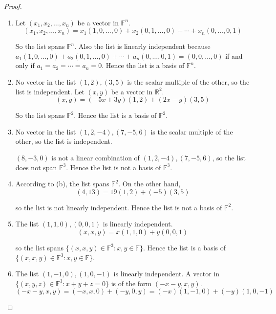 \begin{proof}
    \begin{enumerate}[label={(\alph*)}]
        \item Let $(x_{1}, x_{2}, \ldots, x_{n})$ be a vector in $\mathbb{F}^{n}$.
              \[
                  (x_{1}, x_{2}, \ldots, x_{n}) = x_{1}(1, 0, \ldots, 0) + x_{2}(0, 1, \ldots, 0) + \cdots + x_{n}(0, \ldots, 0, 1)
              \]

              So the list spans $\mathbb{F}^{n}$. Also the list is linearly independent because $a_{1}(1, 0, \ldots, 0) + a_{2}(0, 1, \ldots, 0) + \cdots + a_{n}(0, \ldots, 0, 1) = (0, 0, \ldots, 0)$ if and only if $a_{1} = a_{2} = \cdots = a_{n} = 0$. Hence the list is a basis of $\mathbb{F}^{n}$.

        \item No vector in the list $(1, 2), (3, 5)$ is the scalar multiple of the other, so the list is independent. Let $(x, y)$ be a vector in $\mathbb{R}^{2}$.
              \[
                  (x, y) = (-5x + 3y)(1, 2) + (2x - y)(3, 5)
              \]

              So the list spans $\mathbb{F}^{2}$. Hence the list is a basis of $\mathbb{F}^{2}$.
        \item No vector in the list $(1, 2, -4), (7, -5, 6)$ is the scalar multiple of the other, so the list is independent.

              $(8, -3, 0)$ is not a linear combination of $(1, 2, -4), (7, -5, 6)$, so the list does not span $\mathbb{F}^{3}$. Hence the list is not a basis of $\mathbb{F}^{3}$.
        \item According to (b), the list spans $\mathbb{F}^{2}$. On the other hand,
              \[
                  (4, 13) = 19(1, 2) + (-5)(3, 5)
              \]

              so the list is not linearly independent. Hence the list is not a basis of $\mathbb{F}^{2}$.
        \item The list $(1, 1, 0), (0, 0, 1)$ is linearly independent.
              \[
                  (x, x, y) = x(1, 1, 0) + y(0, 0, 1)
              \]

              so the list spans $\{ (x, x, y)\in\mathbb{F}^{3}: x, y\in\mathbb{F} \}$. Hence the list is a basis of $\{ (x, x, y)\in\mathbb{F}^{3}: x, y\in\mathbb{F} \}$.
        \item The list $(1, -1, 0), (1, 0, -1)$ is linearly independent. A vector in $\{ (x, y, z)\in\mathbb{F}^{3}: x + y + z = 0 \}$ is of the form $(-x-y, x, y)$.
              \[
                  (-x-y, x, y) = (-x, x, 0) + (-y, 0, y) = (-x)(1, -1, 0) + (-y)(1, 0, -1)
              \]


\end{enumerate}
\end{proof}
